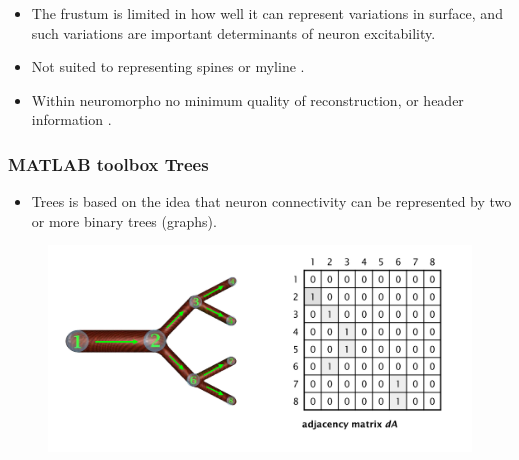 \documentclass[notes=hide]{beamer}
\begin{document}
{\begin{frame}
\begin{itemize}
\item The frustum is limited in how well it can represent variations in surface, and such variations are important determinants of neuron excitability.
\vfill
\item Not suited to representing spines or myline \cite{slezak2014brain}.
\vfill
\item Within neuromorpho no minimum quality of reconstruction, or header information \cite{slezak2014brain}. 
\end{itemize}
\end{frame}


\begin{frame}
\frametitle{MATLAB toolbox Trees}
\begin{itemize}
\item Trees is based on the idea that neuron connectivity can be represented by two or more binary trees (graphs). 
\vfill

\end{itemize}
\begin{figure}
\includegraphics[scale=0.2]{topology_tree2.png} 
\end{figure}
\vfill
\cite{cuntz2011trees}
\end{frame}




}
\end{document}
